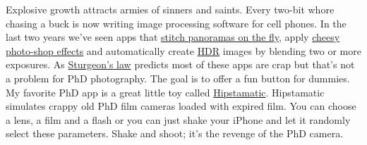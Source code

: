 Explosive growth attracts armies of sinners and saints. Every two-bit
whore chasing a buck is now writing image processing software for cell
phones. In the last two years we've seen apps that
\href{http://itunes.apple.com/us/app/360-panorama/id377342622?mt=8}{stitch
panoramas on the fly}, apply
\href{http://www.appbrain.com/app/camera-360/vStudio.Android.GPhoto}{cheesy
photo-shop effects} and automatically create
\href{http://en.wikipedia.org/wiki/High\_dynamic\_range\_imaging}{HDR}
images by blending two or more exposures. As
\href{http://en.wikipedia.org/wiki/Sturgeon's\_Law}{Sturgeon's law}
predicts most of these apps are crap but that's not a problem for PhD
photography. The goal is to offer a fun button for dummies. My favorite
PhD app is a great little toy called
\href{http://hipstamatic.com/the\_app.html}{Hipstamatic}. Hipstamatic
simulates crappy old PhD film cameras loaded with expired film. You can
choose a lens, a film and a flash or you can just shake your iPhone and
let it randomly select these parameters. Shake and shoot; it's the
revenge of the PhD camera.






%